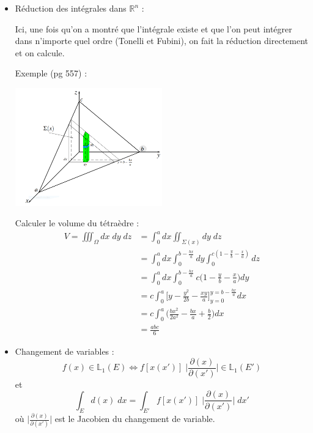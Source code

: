\documentclass[a4paper]{article}
\begin{document}
\begin{itemize}
\item Réduction des intégrales dans $ \mathbb{R}^n $ : 

Ici, une fois qu'on a montré que l'intégrale existe et que l'on peut intégrer dans n'importe quel ordre (Tonelli et Fubini), on fait la réduction directement et on calcule.

Exemple (pg 557) : 

\begin{center}
\includegraphics[width=0.5\textwidth]{images/tetraedre.PNG}
\end{center}

Calculer le volume du tétraèdre : 
\begin{align*}
V = \iiint_\Omega d x \; d y \; d z &= \int_0^a d x \iint_{\Sigma (x)} d y \; d z \\
 &= \int_0^a d x \int_0^{b - \frac{b x}{a}} d y \int_0^{c (1 - \frac{y}{b} - \frac{x}{a})} d z \\
 &= \int_0^a d x \int_0^{b - \frac{b x}{a}} c \bigg( 1 - \frac{y}{b} - \frac{x}{a} \bigg) d y \\
 &= c \int_0^a \bigg[ y - \frac{y^2}{2 b} - \frac{x y}{a} \bigg]_{y=0}^{y=b-\frac{b x}{a}} d x \\
 &= c \int_0^a \bigg( \frac{b x^2}{2 a^2} - \frac{b x}{a} + \frac{b}{2} \bigg) d x \\
 &= \frac{a b c}{6}
\end{align*}






\item Changement de variables : 
\[ f(x) \in \mathbb{L}_1(E) \iff f[x(x')] \; \bigg| \frac{\partial (x)}{\partial (x')} \bigg| \in \mathbb{L}_1 (E') \]
et \[ \int_E d(x) \; d x = \int_{E'} f[x(x')] \; \bigg| \frac{\partial (x)}{\partial (x')} \bigg| \; d x' \]
où $\displaystyle \bigg| \frac{\partial (x)}{\partial (x')} \bigg| $ est le Jacobien du changement de variable.







\end{itemize}
\end{document}
